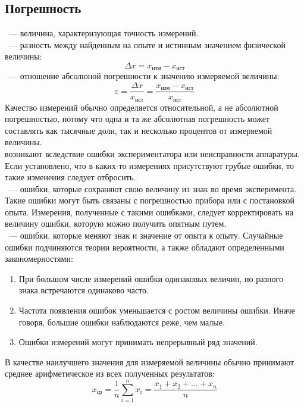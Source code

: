 \subsection{Погрешность}
~--- величина, характеризующая точность измерений.\\
~--- разность между найденным на опыте и истинным значением физической величины:
\begin{equation}
\Delta x = x_\text{изм} - x_\text{ист}
\end{equation}
~--- отношение абсолюной погрешности к значению измеряемой величины:
\begin{equation}
\varepsilon = \frac{\Delta x}{x_\text{ист}} = \frac{x_\text{изм} - x_\text{ист}}{x_\text{ист}}
\end{equation}
Качество измерений обычно определяется относительной, а не абсолютной погрешностью, потому что одна и та же абсолютная погрешность может составлять как тысячные доли, так и несколько процентов от измеряемой величины.\\
 возникают вследствие ошибки экспериментатора или неисправности аппаратуры. Если установлено, что в каких-то измерениях присутствуют грубые ошибки, то такие изменения следует отбросить.\\
~--- ошибки, которые сохраняют свою величину из знак во время эксперимента. Такие ошибки могут быть связаны с погрешностью прибора или с постановкой опыта. Измерения, полученные с такими ошибками, следует корректировать на величину ошибки, которую можно получить опятным путем.\\
~--- ошибки, которые меняют знак и значение от опыта к опыту. Случайные ошибки подчиняются теории вероятности, а также обладают определенными закономерностями:
\begin{enumerate}[1.]
\item
{При большом числе измерений ошибки одинаковых величин, но разного знака встречаются одинаково часто.}
\item
{Частота появления ошибок уменьшается с ростом величины ошибки. Иначе говоря, большие ошибки наблюдаются реже, чем малые.}
\item
{Ошибки измерений могут принимать непрерывный ряд значений.}
\end{enumerate}
В качестве наилучшего значения для измеряемой величины обычно принимают среднее арифметическое из всех полученных результатов:
\begin{equation}
x_\text{ср} = \frac{1}{n}\sum\limits_{i=1}^n x_i = \frac{x_1 + x_2+\ldots + x_n}{n}
\end{equation}
